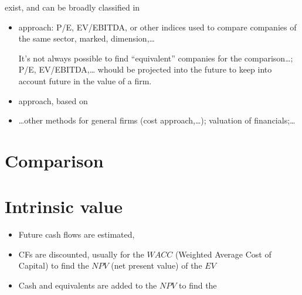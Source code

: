 \documentclass[letterpaper,10pt,english]{jupyterBook}
\begin{document}
\sphinxAtStartPar
{} exist, and can be broadly classified in
\begin{itemize}
\item {} 
\sphinxAtStartPar
{} approach: P/E, EV/EBITDA, or other indices used to compare companies of the same sector, marked, dimension,…%
\begin{footnote}[1]\sphinxAtStartFootnote
It’s not always possible to find “equivalent” companies for the comparison…; P/E, EV/EBITDA,… whould be projected into the future to keep into account future in the value of a firm.
%
\end{footnote}

\item {} 
\sphinxAtStartPar
{} approach, based on 

\item {} 
\sphinxAtStartPar
…other methods for general firms (cost approach,…); valuation of financials;…

\end{itemize}


\section{Comparison}
\label{\detokenize{ch/assets/equity:comparison}}\label{\detokenize{ch/assets/equity:fin-edu-assets-equity-comparison}}

\section{Intrinsic value}
\label{\detokenize{ch/assets/equity:intrinsic-value}}\label{\detokenize{ch/assets/equity:fin-edu-assets-equity-intrinsic}}\begin{itemize}
\item {} 
\sphinxAtStartPar
Future cash flows are estimated,

\item {} 
\sphinxAtStartPar
CFs are discounted, usually for the \(WACC\) (Weighted Average Cost of Capital) to find the \(NPV\) (net present value) of the  \(EV\)

\item {} 
\sphinxAtStartPar
Cash and equivalents are added to the \(NPV\) to find the 

\end{itemize}
\end{document}

